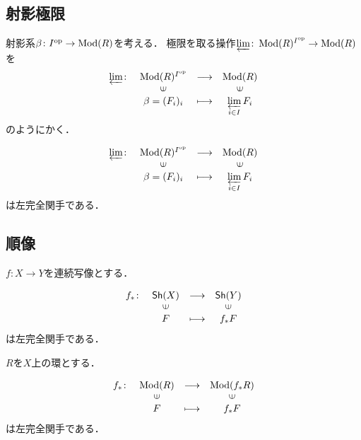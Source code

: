 \subsection{射影極限}
射影系$\beta\colon I^{\rm op}\to \mathop{\mathrm{Mod}}\nolimits(R)$を考える．
極限を取る操作$\varprojlim\colon\mathop{\mathrm{Mod}}\nolimits(R)^{I^{\rm op}}\to\mathop{\mathrm{Mod}}\nolimits(R)$を
\begin{equation*}
    \begin{array}{rccc}
        \varprojlim\colon&\Mod(R)^{I^\op}&\longrightarrow&\Mod(R)\\
            &\rotatebox{90}{$\in$}&&\rotatebox{90}{$\in$}\\
            &\beta=(F_i)_i &\longmapsto&\varprojlim\limits_{i\in I}F_i
    \end{array}
\end{equation*}
のようにかく．

\begin{PRP}
    \begin{equation*}
        \begin{array}{rccc}
            \varprojlim\colon&\Mod(R)^{I^\op}&\longrightarrow&\Mod(R)\\
                &\rotatebox{90}{$\in$}&&\rotatebox{90}{$\in$}\\
                &\beta=(F_i)_i &\longmapsto&\varprojlim\limits_{i\in I}F_i
        \end{array}
    \end{equation*}
    は左完全関手である．        
\end{PRP}

\subsection{順像}
\(f\colon X\to Y\)を連続写像とする．


\begin{PRP}
    \[
        \begin{array}{rccc}
            f_\ast\colon&   \Sh(X)& \longrightarrow& \Sh(Y) \\
            &   \rotatebox{90}{$\in$}&&\rotatebox{90}{$\in$}\\
            &   F&  \longmapsto&    f_\ast F   
        \end{array}
    \]
    は左完全関手である．
\end{PRP}


\(R\)を\(X\)上の環とする．
\begin{PRP}
    \[
        \begin{array}{rccc}
            f_\ast\colon&   \Mod(R)& \longrightarrow& \Mod(f_\ast R)\\
            &   \rotatebox{90}{$\in$}&&\rotatebox{90}{$\in$}\\
            &   F&  \longmapsto&    f_\ast F   
        \end{array}
    \]
    は左完全関手である．
\end{PRP}


